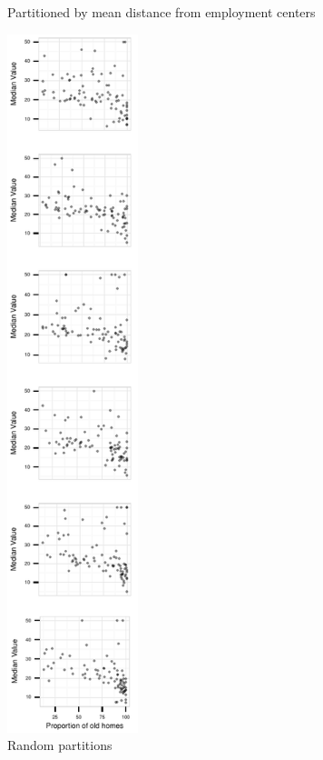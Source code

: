 \begin{figure}
\begin{subfigure}[t]{1.5in}
	\caption{Partitioned by mean distance from employment centers}
	 \label{fig:method_actual}
    \end{subfigure}
    \begin{subfigure}[t]{1.5in}
 	 \includegraphics[width=1.5in]{images/randCluster.pdf}
     \vspace{-0.37cm}
 	 \caption{Random partitions}
	 \label{fig:method_random}
    \end{subfigure}
     \begin{subfigure}[t]{2.5in}

\end{subfigure}
\end{figure}
